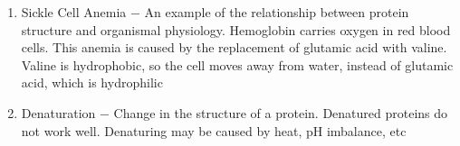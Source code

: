 \documentclass[12pt]{article}
\begin{document}
\begin{itemize}
\begin{enumerate}
\begin{enumerate}
          \end{enumerate}

        \item Sickle Cell Anemia $-$ An example of the relationship between protein structure and organismal physiology. Hemoglobin carries oxygen in red blood cells. This anemia is caused by the replacement of glutamic acid with valine. Valine is hydrophobic, so the cell moves away from water, instead of glutamic acid, which is hydrophilic

        \item Denaturation $-$ Change in the structure of a protein. Denatured proteins do not work well. Denaturing may be caused by heat, pH imbalance, etc
        
    \end{enumerate}

\end{itemize}
\end{document}

